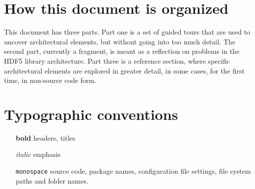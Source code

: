 \section{How this document is organized}

This document has three parts. Part one is a set of guided tours that are used to uncover architectural elements, but without going into too much detail. The second part, currently a fragment, is meant as a reflection on problems in the HDF5 library architecture. Part three is a reference section, where specific architectural elements are explored in greater detail, in some cases, for the first time, in non-source code form.

\section{Typographic conventions}

\begin{itemize}
    \item[\textbf{bold}] headers, titles
    \item[\textit{italic}] emphasis
    \item[\texttt{monospace}] source code, package names, configuration file settings, file system paths and folder names.
\end{itemize}